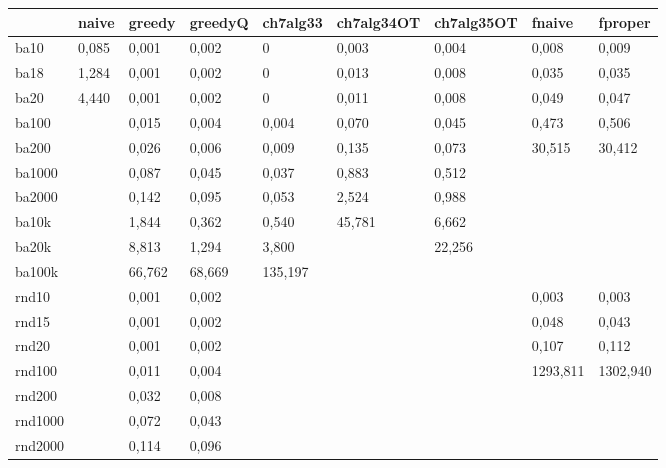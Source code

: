 \begin{table}[h]
	\centering
	\begin{tabular}{lllllllll}
		\hline
		& naive & greedy & greedyQ & ch7alg33 & ch7alg34OT & ch7alg35OT & fnaive   & fproper \\ \hline
		ba10    & 0,085 & 0,001  & 0,002   & 0        & 0,003      & 0,004      & 0,008    & 0,009   \\
		ba18    & 1,284 & 0,001  & 0,002   & 0        & 0,013      & 0,008      & 0,035    & 0,035   \\
		ba20    & 4,440 & 0,001  & 0,002   & 0        & 0,011      & 0,008      & 0,049    & 0,047   \\
		ba100   &       & 0,015  & 0,004   & 0,004    & 0,070      & 0,045      & 0,473    & 0,506   \\
		ba200   &       & 0,026  & 0,006   & 0,009    & 0,135      & 0,073      & 30,515   & 30,412  \\
		ba1000  &       & 0,087  & 0,045   & 0,037    & 0,883      & 0,512      &          &         \\
		ba2000  &       & 0,142  & 0,095   & 0,053    & 2,524      & 0,988      &          &         \\
		ba10k   &       & 1,844  & 0,362   & 0,540    & 45,781     & 6,662      &          &         \\
		ba20k   &       & 8,813  & 1,294   & 3,800    &            & 22,256     &          &         \\
		ba100k  &       & 66,762 & 68,669  & 135,197  &            &            &          &         \\
		rnd10   &       & 0,001  & 0,002   &          &            &            & 0,003    & 0,003   \\
		rnd15   &       & 0,001  & 0,002   &          &            &            & 0,048    & 0,043   \\
		rnd20   &       & 0,001  & 0,002   &          &            &            & 0,107    & 0,112   \\
		rnd100  &       & 0,011  & 0,004   &          &            &            & 1293,811 & 1302,940\\
		rnd200  &       & 0,032  & 0,008   &          &            &            &          &         \\
		rnd1000 &       & 0,072  & 0,043   &          &            &            &          &         \\
		rnd2000 &       & 0,114  & 0,096   &          &            &            &          &         \\

\end{tabular}
\end{table}
